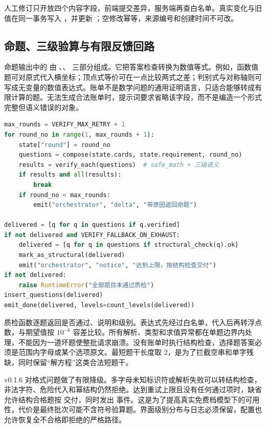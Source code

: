人工修订只开放四个内容字段，前端提交差异，服务端再查白名单。真实变化与旧值在同一事务写入 ，并更新 ；空修改幂等，来源编号和创建时间不可改。

\subsection{命题、三级验算与有限反馈回路}

命题输出中的  由 、、 三部分组成。它把答案检查转换为数值等式。例如，函数值题可对原式代入横坐标；顶点式等价可在一点比较两式之差；判别式与对称轴则可写成无变量的数值表达式。账单不是数学问题的通用证明语言，只适合能够转成有限计算的题。无法生成合法账单时，提示词要求省略该字段，而不是编造一个形式完整但语义错误的对象。

\begin{lstlisting}[language=python,caption={命题与质检的编排伪代码，包含 v0.1.6 的耗尽降级},label={lst:loop}]
max_rounds = VERIFY_MAX_RETRY + 1
for round_no in range(1, max_rounds + 1):
    state["round"] = round_no
    questions = compose(state.cards, state.requirement, round_no)
    results = verify_each(questions)  # safe_math + 三级语义
    if results and all(results):
        break
    if round_no < max_rounds:
        emit("orchestrator", "delta", "带原因返回命题")

delivered = [q for q in questions if q.verified]
if not delivered and VERIFY_FALLBACK_ON_EXHAUST:
    delivered = [q for q in questions if structural_check(q).ok]
    mark_as_structural(delivered)
    emit("orchestrator", "notice", "达到上限，按结构检查交付")
if not delivered:
    raise RuntimeError("全部题目未通过质检")
insert_questions(delivered)
emit_done(delivered, levels=count_levels(delivered))
\end{lstlisting}

质检函数逐题返回是否通过、说明和级别。表达式先经过白名单，代入后再转浮点数，与期望值按 \(10^{-6}\) 容差比较。所有解析、类型和求值异常都在单题边界内处理，不能因为一道坏题使整批请求崩溃。没有账单时执行结构检查，选择题答案必须是范围内字母或某个选项原文。最短题干长度取 2，是为了拦截空串和单字残缺，同时保留“解方程”这类合法短题干。

v0.1.6 对格式问题做了有限降级。多字母未知标识符或解析失败可以转结构检查，非法字符、危险代入和幂结构仍然拒绝。达到重试上限且没有任何通过项时，缺省允许结构合格题按  交付，同时发出  事件。这是为了提高真实免费档模型下的可用性，代价是最终批次可能不含符号验算题。界面级别分布与日志必须保留，配置也允许恢复全不合格即拒绝的严格路径。

